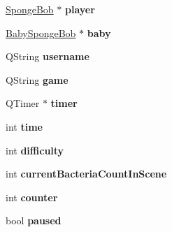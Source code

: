 \begin{DoxyCompactItemize}
\item 
\hypertarget{classHeader_a85ac821bfce84ceb3978d65f53e2b558}{\hyperlink{classSpongeBob}{Sponge\-Bob} $\ast$ {\bfseries player}}\label{classHeader_a85ac821bfce84ceb3978d65f53e2b558}

\item 
\hypertarget{classHeader_aedf088252280ab5eb09c73e5fd3517ad}{\hyperlink{classBabySpongeBob}{Baby\-Sponge\-Bob} $\ast$ {\bfseries baby}}\label{classHeader_aedf088252280ab5eb09c73e5fd3517ad}

\item 
\hypertarget{classHeader_ace92a7d778ae16edec96ff5c25fcf901}{Q\-String {\bfseries username}}\label{classHeader_ace92a7d778ae16edec96ff5c25fcf901}

\item 
\hypertarget{classHeader_a7f997858c1f7a9f88e50fcbf464a5d38}{Q\-String {\bfseries game}}\label{classHeader_a7f997858c1f7a9f88e50fcbf464a5d38}

\item 
\hypertarget{classHeader_a3322a706106c6a42600ae2acbd6fe155}{Q\-Timer $\ast$ {\bfseries timer}}\label{classHeader_a3322a706106c6a42600ae2acbd6fe155}

\item 
\hypertarget{classHeader_a44ca0ffcdf952bb61362f5a365f3a573}{int {\bfseries time}}\label{classHeader_a44ca0ffcdf952bb61362f5a365f3a573}

\item 
\hypertarget{classHeader_ac7d3698ffe7993f0153783a8dcd9bf2f}{int {\bfseries difficulty}}\label{classHeader_ac7d3698ffe7993f0153783a8dcd9bf2f}

\item 
\hypertarget{classHeader_a5b09994627054550891bce868d51cefb}{int {\bfseries current\-Bacteria\-Count\-In\-Scene}}\label{classHeader_a5b09994627054550891bce868d51cefb}

\item 
\hypertarget{classHeader_a9b351d1a7df2d6c40e96afe9a3d1d0d8}{int {\bfseries counter}}\label{classHeader_a9b351d1a7df2d6c40e96afe9a3d1d0d8}

\item 
\hypertarget{classHeader_a6523f2b63659afa3205a48e9805aed3b}{bool {\bfseries paused}}\label{classHeader_a6523f2b63659afa3205a48e9805aed3b}

\end{DoxyCompactItemize}


